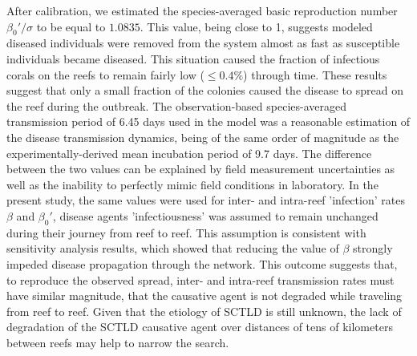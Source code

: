 After calibration, we estimated the species-averaged basic reproduction number $\beta_0'/\sigma$ to be equal to $1.0835$. This value, being close to 1, suggests modeled diseased individuals were removed from the system almost as fast as susceptible individuals became diseased. This situation caused the fraction of infectious corals on the reefs to remain fairly low (\ie $\leq 0.4\%$) through time. These results suggest that only a small fraction of the colonies caused the disease to spread on the reef during the outbreak. The observation-based species-averaged transmission period of 6.45 days used in the model was a reasonable estimation of the disease transmission dynamics, being of the same order of magnitude as the experimentally-derived mean incubation period of 9.7 days. The difference between the two values can be explained by field measurement uncertainties as well as the inability to perfectly mimic field conditions in laboratory. In the present study, the same values were used for inter- and intra-reef 'infection' rates $\beta$ and $\beta_0'$, \ie disease agents 'infectiousness' was assumed to remain unchanged during their journey from reef to reef. This assumption is consistent with sensitivity analysis results, which showed that reducing the value of $\beta$ strongly impeded disease propagation through the network. This outcome suggests that, to reproduce the observed spread, inter- and intra-reef transmission rates must have similar magnitude, \ie that the causative agent is not degraded while traveling from reef to reef. Given that the etiology of SCTLD is still unknown, the lack of degradation of the SCTLD causative agent over distances of tens of kilometers between reefs may help to narrow the search.


